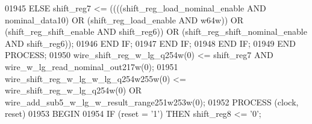 \begin{DoxyCode}
{01945                 \textcolor{keywordflow}{ELSE} \textcolor{vhdlchar}{shift_reg7} \textcolor{vhdlchar}{<=} \textcolor{vhdlchar}{(}\textcolor{vhdlchar}{(}\textcolor{vhdlchar}{(}\textcolor{vhdlchar}{(}\textcolor{vhdlchar}{shift_reg_load_nominal_enable} \textcolor{keywordflow}{AND} \textcolor{vhdlchar}{
      nominal_data10}\textcolor{vhdlchar}{)} \textcolor{keywordflow}{OR} \textcolor{vhdlchar}{(}\textcolor{vhdlchar}{shift_reg_load_enable} \textcolor{keywordflow}{AND} \textcolor{vhdlchar}{w64w}\textcolor{vhdlchar}{)}\textcolor{vhdlchar}{)} \textcolor{keywordflow}{OR} \textcolor{vhdlchar}{(}\textcolor{vhdlchar}{shift_reg_shift_enable} \textcolor{keywordflow}{AND} \textcolor{vhdlchar}{
      shift_reg6}\textcolor{vhdlchar}{)}\textcolor{vhdlchar}{)} \textcolor{keywordflow}{OR} \textcolor{vhdlchar}{(}\textcolor{vhdlchar}{shift_reg_shift_nominal_enable} \textcolor{keywordflow}{AND} \textcolor{vhdlchar}{shift_reg6}\textcolor{vhdlchar}{)}\textcolor{vhdlchar}{)};
01946                 \textcolor{keywordflow}{END} \textcolor{keywordflow}{IF};
01947             \textcolor{keywordflow}{END} \textcolor{keywordflow}{IF};
01948         \textcolor{keywordflow}{END} \textcolor{keywordflow}{IF};
01949     \textcolor{keywordflow}{END} \textcolor{keywordflow}{PROCESS};
01950     \textcolor{vhdlchar}{wire_shift_reg_w_lg_q254w}\textcolor{vhdlchar}{(}\textcolor{vhdllogic}{}\textcolor{vhdllogic}{0}\textcolor{vhdlchar}{)} \textcolor{vhdlchar}{<=} \textcolor{vhdlchar}{shift_reg7} \textcolor{keywordflow}{AND} \textcolor{vhdlchar}{
      wire_w_lg_read_nominal_out217w}\textcolor{vhdlchar}{(}\textcolor{vhdllogic}{}\textcolor{vhdllogic}{0}\textcolor{vhdlchar}{)};
01951     \textcolor{vhdlchar}{wire_shift_reg_w_lg_w_lg_q254w255w}\textcolor{vhdlchar}{(}\textcolor{vhdllogic}{}\textcolor{vhdllogic}{0}\textcolor{vhdlchar}{)} \textcolor{vhdlchar}{<=} \textcolor{vhdlchar}{wire_shift_reg_w_lg_q254w}\textcolor{vhdlchar}{(}\textcolor{vhdllogic}{}\textcolor{vhdllogic}{0}\textcolor{vhdlchar}{)} \textcolor{keywordflow}{OR} \textcolor{vhdlchar}{
      wire_add_sub5_w_lg_w_result_range251w253w}\textcolor{vhdlchar}{(}\textcolor{vhdllogic}{}\textcolor{vhdllogic}{0}\textcolor{vhdlchar}{)};
01952     \textcolor{keywordflow}{PROCESS} (clock, reset)
01953 \textcolor{vhdlkeyword}{    BEGIN}
01954         \textcolor{keywordflow}{IF} \textcolor{vhdlchar}{(}\textcolor{vhdlchar}{reset} \textcolor{vhdlchar}{=} \textcolor{vhdlchar}{'}\textcolor{vhdllogic}{}\textcolor{vhdllogic}{1}\textcolor{vhdlchar}{'}\textcolor{vhdlchar}{)} \textcolor{keywordflow}{THEN} \textcolor{vhdlchar}{shift_reg8} \textcolor{vhdlchar}{<=} \textcolor{vhdlchar}{'}\textcolor{vhdllogic}{}\textcolor{vhdllogic}{0}\textcolor{vhdlchar}{'};
}
\end{DoxyCode}

